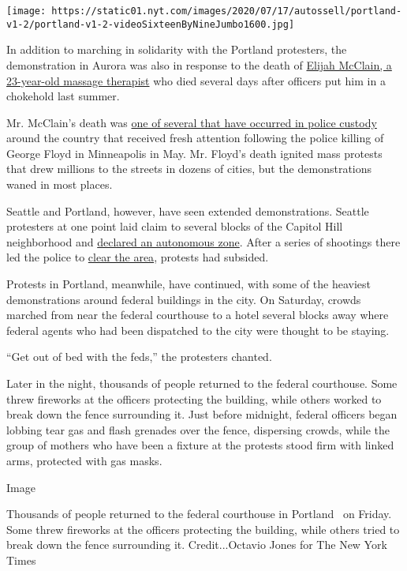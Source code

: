 \texttt{[image: https://static01.nyt.com/images/2020/07/17/autossell/portland-v1-2/portland-v1-2-videoSixteenByNineJumbo1600.jpg]}

In addition to marching in solidarity with the Portland protesters, the
demonstration in Aurora was also in response to the death of
\href{https://www.nytimes.com/article/who-was-elijah-mcclain.html}{Elijah
McClain, a 23-year-old massage therapist} who died several days after
officers put him in a chokehold last summer.

Mr. McClain's death was
\href{https://www.nytimes.com/2020/06/20/us/elijah-mcclain-police-killings.html}{one
of several that have occurred in police custody} around the country that
received fresh attention following the police killing of George Floyd in
Minneapolis in May. Mr. Floyd's death ignited mass protests that drew
millions to the streets in dozens of cities, but the demonstrations
waned in most places.

Seattle and Portland, however, have seen extended demonstrations.
Seattle protesters at one point laid claim to several blocks of the
Capitol Hill neighborhood and
\href{https://www.nytimes.com/2020/06/11/us/seattle-autonomous-zone.html}{declared
an autonomous zone}. After a series of shootings there led the police to
\href{https://www.nytimes.com/2020/07/01/us/seattle-protest-zone-CHOP-CHAZ-unrest.html}{clear
the area}, protests had subsided.

Protests in Portland, meanwhile, have continued, with some of the
heaviest demonstrations around federal buildings in the city. On
Saturday, crowds marched from near the federal courthouse to a hotel
several blocks away where federal agents who had been dispatched to the
city were thought to be staying.

``Get out of bed with the feds,'' the protesters chanted.

Later in the night, thousands of people returned to the federal
courthouse. Some threw fireworks at the officers protecting the
building, while others worked to break down the fence surrounding it.
Just before midnight, federal officers began lobbing tear gas and flash
grenades over the fence, dispersing crowds, while the group of mothers
who have been a fixture at the protests stood firm with linked arms,
protected with gas masks.

Image

Thousands of people returned to the federal courthouse in Portland~ on
Friday. Some threw fireworks at the officers protecting the building,
while others tried to break down the fence surrounding it.
Credit...Octavio Jones for The New York Times

